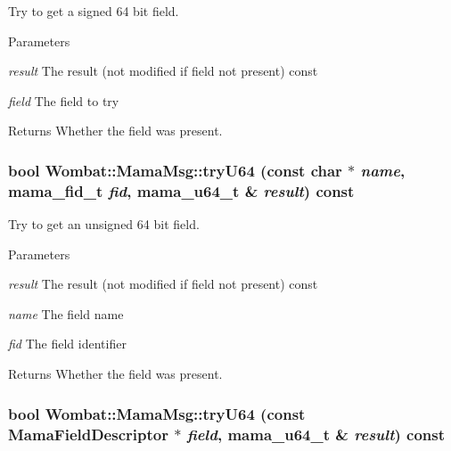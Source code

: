 Try to get a signed 64 bit field. 
\begin{DoxyParams}{Parameters}
\item[{\em result}]The result (not modified if field not present) const \item[{\em field}]The field to try \end{DoxyParams}
\begin{DoxyReturn}{Returns}
Whether the field was present. 
\end{DoxyReturn}
\hypertarget{classWombat_1_1MamaMsg_a1b0913afc43050d0992aac4dc97e56c4}{
\subsubsection[{tryU64}]{\setlength{\rightskip}{0pt plus 5cm}bool Wombat::MamaMsg::tryU64 (const char $\ast$ {\em name}, \/  mama\_\-fid\_\-t {\em fid}, \/  mama\_\-u64\_\-t \& {\em result}) const}}
\label{classWombat_1_1MamaMsg_a1b0913afc43050d0992aac4dc97e56c4}


Try to get an unsigned 64 bit field. 
\begin{DoxyParams}{Parameters}
\item[{\em result}]The result (not modified if field not present) const \item[{\em name}]The field name \item[{\em fid}]The field identifier \end{DoxyParams}
\begin{DoxyReturn}{Returns}
Whether the field was present. 
\end{DoxyReturn}
\hypertarget{classWombat_1_1MamaMsg_ae51b09b277379a8435709aaeda584e61}{
\subsubsection[{tryU64}]{\setlength{\rightskip}{0pt plus 5cm}bool Wombat::MamaMsg::tryU64 (const {\bf MamaFieldDescriptor} $\ast$ {\em field}, \/  mama\_\-u64\_\-t \& {\em result}) const}}
\label{classWombat_1_1MamaMsg_ae51b09b277379a8435709aaeda584e61}


